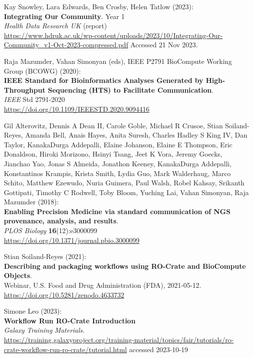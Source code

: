 \documentclass[10pt,letterpaper]{article}
\begin{document}
\begin{thebibliography}{10}
\begin{small}
Kay Snowley, Lara Edwards, Ben Crosby, Helen Tatlow (2023):\\
\textbf{Integrating Our Community}. Year 1 \\
\emph{Health Data Research UK} (report) \\
\url{https://www.hdruk.ac.uk/wp-content/uploads/2023/10/Integrating-Our-Community_v1-Oct-2023-compressed.pdf}
Accessed 21 Nov 2023.

Raja Mazumder, Vahan Simonyan (eds), IEEE P2791 BioCompute Working Group (BCOWG) (2020):\\
\textbf{IEEE Standard for Bioinformatics Analyses Generated by High-Throughput Sequencing (HTS) to Facilitate Communication}.\\
\emph{IEEE} Std 2791-2020 \\
\url{https://doi.org/10.1109/IEEESTD.2020.9094416}

Gil Alterovitz, Dennis A Dean II, Carole Goble, Michael R Crusoe, Stian Soiland-Reyes, Amanda Bell, Anais Hayes, Anita Suresh, Charles Hadley S King IV, Dan Taylor, KanakaDurga Addepalli, Elaine Johanson, Elaine E Thompson, Eric Donaldson, Hiroki Morizono, Hsinyi Tsang, Jeet K Vora, Jeremy Goecks, Jianchao Yao, Jonas S Almeida, Jonathon Keeney, KanakaDurga Addepalli, Konstantinos Krampis, Krista Smith, Lydia Guo, Mark Walderhaug, Marco Schito, Matthew Ezewudo, Nuria Guimera, Paul Walsh, Robel Kahsay, Srikanth Gottipati, Timothy C Rodwell, Toby Bloom, Yuching Lai, Vahan Simonyan, Raja Mazumder (2018):\\
\textbf{Enabling Precision Medicine via standard communication of NGS provenance, analysis, and results}.\\
\emph{PLOS Biology} \textbf{16}(12):e3000099 \\
\url{https://doi.org/10.1371/journal.pbio.3000099}

Stian Soiland-Reyes (2021):\\
\textbf{Describing and packaging workflows using RO-Crate and BioCompute Objects}.\\
Webinar, U.S. Food and Drug Administration (FDA), 2021-05-12.\\
\url{https://doi.org/10.5281/zenodo.4633732}

Simone Leo (2023):\\
\textbf{Workflow Run RO-Crate Introduction} \\
\emph{Galaxy Training Materials}.\\
\url{https://training.galaxyproject.org/training-material/topics/fair/tutorials/ro-crate-workflow-run-ro-crate/tutorial.html} accessed 2023-10-19









\end{small}


\end{thebibliography}
\end{document}
